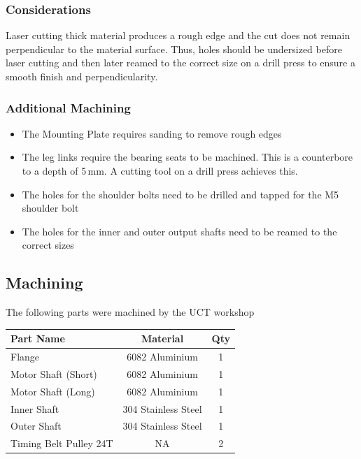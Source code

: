 \documentclass[11pt, titlepage]{article}
\begin{document}
\subsubsection{Considerations}
Laser cutting thick material produces a rough edge and the cut does not remain perpendicular to the material surface. Thus, holes should be undersized before laser cutting and then later reamed to the correct size on a drill press to ensure a smooth finish and perpendicularity.

\subsubsection{Additional Machining}
\begin{itemize}
	\item The Mounting Plate requires sanding to remove rough edges
	\item The leg links require the bearing seats to be machined. This is a counterbore to a depth of 5\,mm. A cutting tool on a drill press achieves this.
	\item The holes for the shoulder bolts need to be drilled and tapped for the M5 shoulder bolt
	\item The holes for the inner and outer output shafts need to be reamed to the correct sizes
\end{itemize}








\newpage
\subsection{Machining}
The following parts were machined by the UCT workshop

\begin{table}[h]
\centering
\begin{tabular}{ l c c}
	\textbf{Part Name} & \textbf{Material} & \textbf{Qty} \\\hline
	Flange & 6082 Aluminium & 1 \\
	Motor Shaft (Short) & 6082 Aluminium & 1 \\
	Motor Shaft (Long) & 6082 Aluminium & 1 \\
	Inner Shaft & 304 Stainless Steel & 1 \\
	Outer Shaft & 304 Stainless Steel & 1 \\
	Timing Belt Pulley 24T & NA & 2 \\\hline
\end{tabular}	
\end{table}
\end{document}
